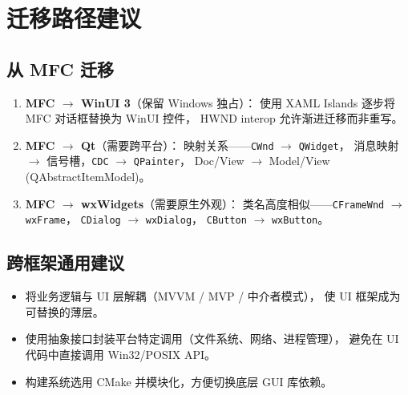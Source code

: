 \documentclass[12pt,a4paper,fontset=fandol]{ctexbook}
\newcommand{\Tp}[1]{\texttt{#1}}
\begin{document}
\chapter{迁移路径建议}

\section{从 MFC 迁移}

\begin{bestpractice}[title=MFC 迁移策略]
\begin{enumerate}
  \item \textbf{MFC $\rightarrow$ WinUI 3}（保留 Windows 独占）：
    使用 XAML Islands 逐步将 MFC 对话框替换为 WinUI 控件，
    HWND interop 允许渐进迁移而非重写。
  \item \textbf{MFC $\rightarrow$ Qt}（需要跨平台）：
    映射关系——\Tp{CWnd} $\rightarrow$ \Tp{QWidget}，
    消息映射 $\rightarrow$ 信号槽，\Tp{CDC} $\rightarrow$ \Tp{QPainter}，
    Doc/View $\rightarrow$ Model/View (QAbstractItemModel)。
  \item \textbf{MFC $\rightarrow$ wxWidgets}（需要原生外观）：
    类名高度相似——\Tp{CFrameWnd} $\rightarrow$ \Tp{wxFrame}，
    \Tp{CDialog} $\rightarrow$ \Tp{wxDialog}，
    \Tp{CButton} $\rightarrow$ \Tp{wxButton}。
\end{enumerate}
\end{bestpractice}

\section{跨框架通用建议}

\begin{guideline}[title=架构层面的迁移准备]
\begin{itemize}
  \item 将业务逻辑与 UI 层解耦（MVVM / MVP / 中介者模式），
        使 UI 框架成为可替换的薄层。
  \item 使用抽象接口封装平台特定调用（文件系统、网络、进程管理），
        避免在 UI 代码中直接调用 Win32/POSIX API。
  \item 构建系统选用 CMake 并模块化，方便切换底层 GUI 库依赖。
\end{itemize}
\end{guideline}
\end{document}
